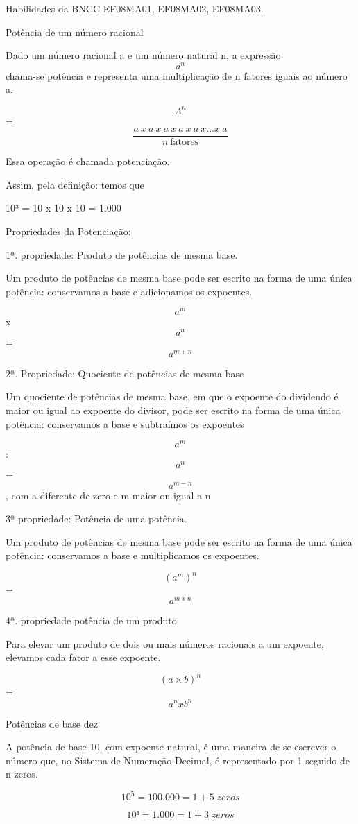 Habilidades da BNCC EF08MA01, EF08MA02, EF08MA03.

Potência de um número racional

Dado um número racional a e um número natural n, a expressão \[ a^n \]
chama-se potência e representa uma multiplicação de n fatores iguais ao
número a.

\[A^n\] =
\[\frac{a\ x\ a\ x\ a\ x\ a\ x\ a\ x\ldots x\ a}{n\ \text{fatores}}\]

Essa operação é chamada potenciação.

Assim, pela definição: temos que

10³ = 10 x 10 x 10 = 1.000

Propriedades da Potenciação:

1ª. propriedade: Produto de potências de mesma base.

Um produto de potências de mesma base pode ser escrito na forma de uma
única potência: conservamos a base e adicionamos os expoentes.

\[a^m\] x \[a^n\] = \[a^{m+n}\]

2ª. Propriedade: Quociente de potências de mesma base

Um quociente de potências de mesma base, em que o expoente do dividendo
é maior ou igual ao expoente do divisor, pode ser escrito na forma de
uma única potência: conservamos a base e subtraímos os expoentes

\[a^m\] : \[a^n\] = \[a^{m-n}\] , com a diferente de zero e m maior ou
igual a n

3ª propriedade: Potência de uma potência.

Um produto de potências de mesma base pode ser escrito na forma de uma
única potência: conservamos a base e multiplicamos os expoentes.

\[(a^m)^n\] = \[a^{m\ x\ n}\]

4ª. propriedade potência de um produto

Para elevar um produto de dois ou mais números racionais a um expoente,
elevamos cada fator a esse expoente.

\[(a \times b)^n\]= \[a^n x b^n\]

Potências de base dez

A potência de base 10, com expoente natural, é uma maneira de se
escrever o número que, no Sistema de Numeração Decimal, é representado
por 1 seguido de n zeros.

\[10^5 = 100.000 = 1 + 5 \;zeros\]

\[10³ = 1.000 = 1+ 3 \;zeros\]

